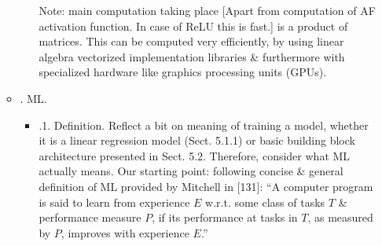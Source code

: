 \documentclass{article}
\begin{document}
\begin{itemize}
\begin{itemize}
\begin{itemize}
			Note: main computation taking place [Apart from computation of AF activation function. In case of ReLU this is fast.] is a product of matrices. This can be computed very efficiently, by using linear algebra vectorized implementation libraries \& furthermore with specialized hardware like graphics processing units (GPUs).
		\end{itemize}
		\item {. ML.} 
		\begin{itemize}
			\item {.1. Definition.} Reflect a bit on meaning of training a model, whether it is a linear regression model (Sect. 5.1.1) or basic building block architecture presented in Sect. 5.2. Therefore, consider what ML actually means. Our starting point: following concise \& general definition of ML provided by {\sc Mitchell} in [131]: ``A computer program is said to learn from experience $E$ w.r.t. some class of tasks $T$ \& performance measure $P$, if its performance at tasks in $T$, as measured by $P$, improves with experience $E$.''
			

\end{itemize}
\end{itemize}
\end{itemize}
\end{document}
